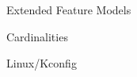 \begin{frame}{\insertsubsection}
	Extended Feature Models
	

	Cardinalities

	Linux/Kconfig %
\end{frame}








